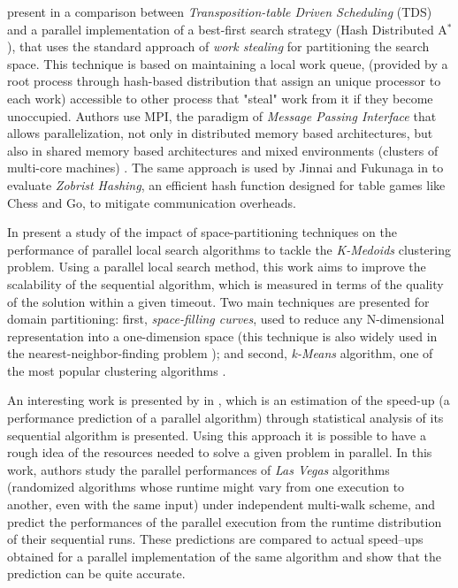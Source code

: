  present in \cite{Kishimoto2013} a comparison between \textit{Transposition-table Driven Scheduling} (TDS) and a parallel implementation of a best-first search strategy (Hash Distributed A$^*$), that uses the standard approach of \textit{work stealing} for partitioning the search space. This technique is based on maintaining a local work queue, (provided by a root process through hash-based distribution that assign an unique processor to each work) accessible to other process that "steal" work from it if they become unoccupied. Authors use MPI, the paradigm of \textit{Message Passing Interface} that allows parallelization, not only in distributed memory based architectures, but also in shared memory based architectures and mixed environments (clusters of multi-core machines) \cite{Grama2003a}. The same approach is used by Jinnai and Fukunaga in \cite{Jinnai} to evaluate \textit{Zobrist Hashing}, an efficient hash function designed for table games like Chess and Go, to mitigate communication overheads.

In \cite{Arbelaez2012}  present a study of the impact of space-partitioning techniques on the performance of parallel local search algorithms to tackle the \textit{K-Medoids} clustering problem. Using a parallel local search method, this work aims to improve the scalability of the sequential algorithm, which is measured in terms of the quality of the solution within a given timeout. Two main techniques are presented for domain partitioning: first, {\it space-filling curves}, used to reduce any N-dimensional representation into a one-dimension space (this technique is also widely used in the nearest-neighbor-finding problem \cite{Chen2005}); and second, {\it k-Means} algorithm, one of the most popular clustering algorithms \cite{Berkhin2002}.

An interesting work is presented by  in \cite{Truchet02}, which is an estimation of the speed-up (a performance prediction of a parallel algorithm) through statistical analysis of its sequential algorithm is presented. Using this approach it is possible to have a rough idea of the resources needed to solve a given problem in parallel. In this work, authors study the parallel performances of \textit{Las Vegas} algorithms \cite{Babai1979} (randomized algorithms whose runtime might vary from one execution to another, even with the same input) under independent multi-walk scheme, and predict the performances of the parallel execution from the runtime distribution of their sequential runs. These predictions are compared to actual speed--ups obtained for a parallel implementation of the same algorithm and show that the prediction can be quite accurate.

